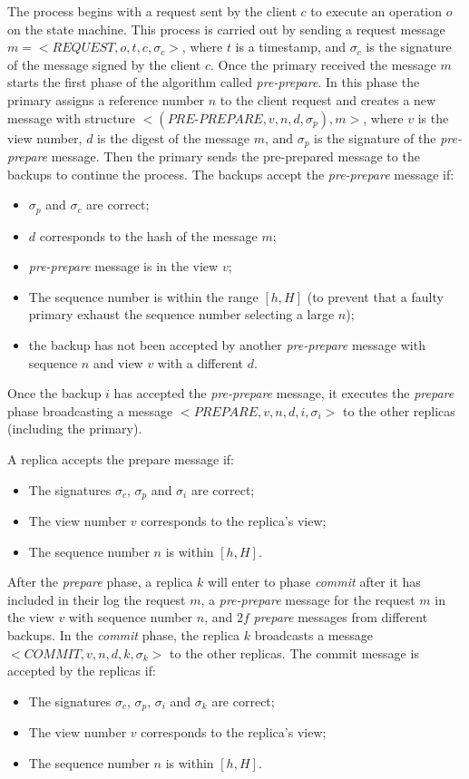 \documentclass[conference]{IEEEtran}
\begin{document}
The process begins with a request sent by the client $c$ to execute an operation $o$ on the state machine. This process is carried out by sending a request message $m=<\textit{REQUEST},o,t,c,\sigma_c>$, where $t$ is a timestamp, and $\sigma_c$ is the signature of the message signed by the client $c$. Once the primary received the message $m$ starts the first phase of the algorithm called \textit{pre-prepare}. In this phase the primary assigns a reference number $n$ to the client request and creates a new message with structure $<(\textit{PRE-PREPARE},v,n,d,\sigma_p),m>$, where $v$ is the view number, $d$ is the digest of the message $m$, and $\sigma_p$ is the signature of the \textit{pre-prepare} message. Then the primary sends the pre-prepared message to the backups to continue the process. The backups accept the \textit{pre-prepare} message if:
\begin{itemize}
\item $\sigma_p$ and $\sigma_c$ are correct;
\item $d$ corresponds to the hash of the message $m$;
\item \textit{pre-prepare} message is in the view $v$;
\item The sequence number is within the range $[h,H]$ (to prevent that a faulty primary exhaust the sequence number selecting a large $n$);
\item the backup has not been accepted by another \textit{pre-prepare} message with sequence $n$ and view $v$ with a different $d$.
\end{itemize}

Once the backup $i$ has accepted the \textit{pre-prepare} message, it executes the \textit{prepare} phase broadcasting a message $<\textit{PREPARE},v,n,d,i,\sigma_i>$ to the other replicas (including the primary). 

A replica accepts the prepare message if:
\begin{itemize}
\item The signatures $\sigma_c$, $\sigma_p$ and $\sigma_i$ are correct;
\item The view number $v$ corresponds to the replica's view;
\item The sequence number $n$ is within $[h,H]$.
\end{itemize}

After the \textit{prepare} phase, a replica $k$ will enter to phase \textit{commit} after it has included in their log the request $m$, a \textit{pre-prepare} message for the request $m$ in the view $v$ with sequence number $n$, and $2f$ \textit{prepare} messages from different backups. In the \textit{commit} phase, the replica $k$  broadcasts a message $<\textit{COMMIT},v,n,d,k,\sigma_k>$ to the other replicas. The commit message is accepted by the replicas if:
\begin{itemize}
\item The signatures $\sigma_c$, $\sigma_p$, $\sigma_i$ and $\sigma_k$ are correct;
\item The view number $v$ corresponds to the replica's view;
\item The sequence number $n$ is within $[h,H]$.
\end{itemize}
\end{document}

